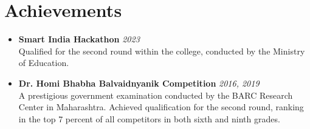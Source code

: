 \documentclass[a4paper,11pt]{article}
\begin{document}
\section{Achievements}
\vspace{-0.4mm}
\begin{itemize}
    \setlength\itemindent{-2em} %
    \item \textbf{Smart India Hackathon} \hfill \textit{2023} \\
    \hspace{0em}Qualified for the second round within the college, conducted by the Ministry of Education.
    
    \item \textbf{Dr. Homi Bhabha Balvaidnyanik Competition} \hfill \textit{2016, 2019} \\
    \hspace{0em}A prestigious government examination conducted by the BARC Research Center in Maharashtra. Achieved qualification for the second round, ranking in the top 7 percent of all competitors in both sixth and ninth grades.
\end{itemize}






\end{document}

